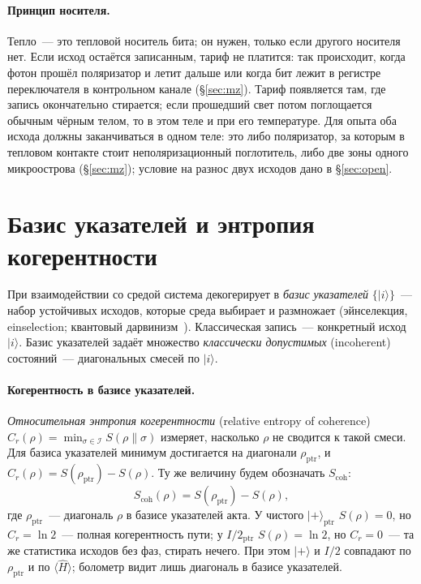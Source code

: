 \documentclass[11pt,a4paper]{article}
\newcommand{\Sref}[1]{\hyperref[#1]{\S\ref{#1}}}
\begin{document}
\paragraph{Принцип носителя.}
Тепло~--- это тепловой носитель бита; он нужен, только если другого носителя нет. Если исход остаётся записанным, тариф не платится: так происходит, когда фотон прошёл поляризатор и летит дальше или когда бит лежит в регистре переключателя в контрольном канале (\Sref{sec:mz}). Тариф появляется там, где запись окончательно стирается; если прошедший свет потом поглощается обычным чёрным телом, то в этом теле и при его температуре. Для опыта оба исхода должны заканчиваться в одном теле: это либо поляризатор, за которым в тепловом контакте стоит неполяризационный поглотитель, либо две зоны одного микроострова (\Sref{sec:mz}); условие на разнос двух исходов дано в \Sref{sec:open}.

\section{Базис указателей и энтропия когерентности}\label{sec:pointer}

При взаимодействии со средой система декогерирует в \emph{базис указателей} $\{|i\rangle\}$~--- набор устойчивых исходов, которые среда выбирает и размножает (эйнселекция, einselection; квантовый дарвинизм~\cite{zurek2009}). Классическая запись~--- конкретный исход $|i\rangle$. Базис указателей задаёт множество \emph{классически допустимых} (incoherent) состояний~--- диагональных смесей по $|i\rangle$.

\paragraph{Когерентность в базисе указателей.}
\emph{Относительная энтропия когерентности} (relative entropy of coherence)~\cite{baumgratz2014,streltsov2017} $C_r(\rho)=\min_{\sigma\in\mathcal{I}} S(\rho\|\sigma)$ измеряет, насколько $\rho$ не сводится к такой смеси. Для базиса указателей минимум достигается на диагонали $\rho_{\mathrm{ptr}}$, и $C_r(\rho)=S(\rho_{\mathrm{ptr}})-S(\rho)$. Ту же величину будем обозначать $S_{\mathrm{coh}}$:
\begin{equation}
S_{\mathrm{coh}}(\rho) = S(\rho_{\mathrm{ptr}}) - S(\rho),
\end{equation}
где $\rho_{\mathrm{ptr}}$~--- диагональ $\rho$ в базисе указателей акта. У чистого $|{+}\rangle_{\mathrm{ptr}}$ $S(\rho)=0$, но $C_r=\ln 2$~--- полная когерентность пути; у $I/2_{\mathrm{ptr}}$ $S(\rho)=\ln 2$, но $C_r=0$~--- та же статистика исходов без фаз, стирать нечего. При этом $|{+}\rangle$ и $I/2$ совпадают по $\rho_{\mathrm{ptr}}$ и по $\langle\hat{H}\rangle$; болометр видит лишь диагональ в базисе указателей.
\end{document}
